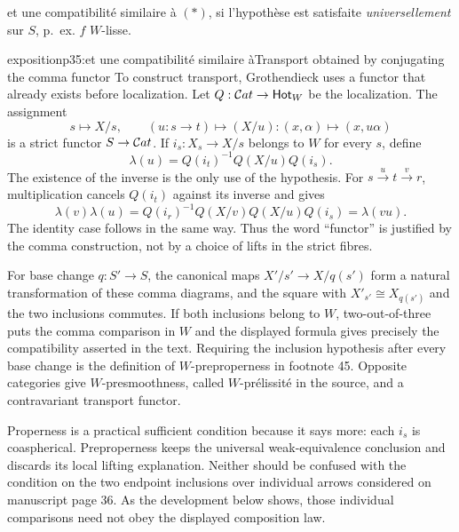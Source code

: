 \leavevmode{}et une compatibilité similaire à $(*)$, si l'hypothèse est satisfaite \textit{universellement} sur $S$, p.~ex. $f$ $W$-lisse.

\begin{dcomment}{exposition}{p35:et une compatibilité similaire à}{Transport obtained by conjugating the comma functor}
To construct transport, Grothendieck uses a functor that already exists before localization. Let $Q:\mathcal{C}at\to\mathsf{Hot}_W$ be the localization. The assignment
\[
 s\longmapsto X/s,\qquad
 (u:s\to t)\longmapsto(X/u):(x,\alpha)\longmapsto(x,u\alpha)
\]
is a strict functor $S\to\mathcal{C}at$. If $i_s:X_s\to X/s$ belongs to $W$ for every $s$, define
\[
 \lambda(u)=Q(i_t)^{-1}Q(X/u)Q(i_s).
\]
The existence of the inverse is the only use of the hypothesis. For $s\xrightarrow u t\xrightarrow v r$, multiplication cancels $Q(i_t)$ against its inverse and gives
\[
 \lambda(v)\lambda(u)
 =Q(i_r)^{-1}Q(X/v)Q(X/u)Q(i_s)
 =\lambda(vu).
\]
The identity case follows in the same way. Thus the word ``functor'' is justified by the comma construction, not by a choice of lifts in the strict fibres.

For base change $q:S'\to S$, the canonical maps $X'/s'\to X/q(s')$ form a natural transformation of these comma diagrams, and the square with $X'_{s'}\cong X_{q(s')}$ and the two inclusions commutes. If both inclusions belong to $W$, two-out-of-three puts the comma comparison in $W$ and the displayed formula gives precisely the compatibility asserted in the text. Requiring the inclusion hypothesis after every base change is the definition of $W$-preproperness in footnote 45. Opposite categories give $W$-presmoothness, called $W$-prélissité in the source, and a contravariant transport functor.

Properness is a practical sufficient condition because it says more: each $i_s$ is coaspherical. Preproperness keeps the universal weak-equivalence conclusion and discards its local lifting explanation. Neither should be confused with the condition on the two endpoint inclusions over individual arrows considered on manuscript page 36. As the development below shows, those individual comparisons need not obey the displayed composition law.
\end{dcomment}


